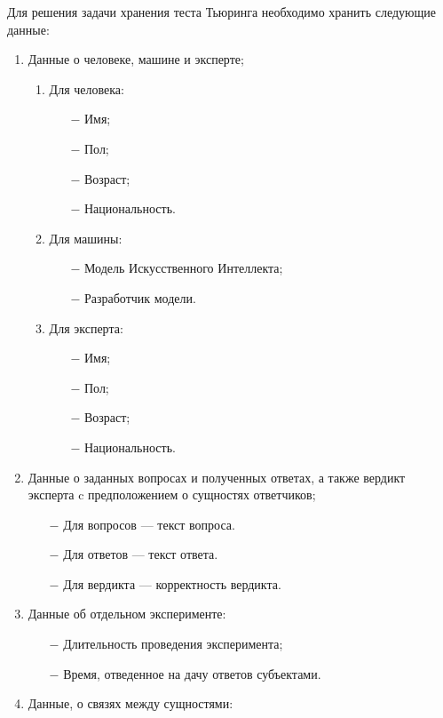 Для решения задачи хранения теста Тьюринга необходимо хранить следующие данные:
\begin{enumerate}
  \item Данные о человеке, машине и эксперте;
  \begin{enumerate}
    \item Для человека:
      \begin{itemize}
        \item[$-$] Имя;
        \item[$-$] Пол;
        \item[$-$] Возраст;
        \item[$-$] Национальность.
      \end{itemize}
    \item Для машины:
      \begin{itemize}
        \item[$-$] Модель Искусственного Интеллекта;
        \item[$-$] Разработчик модели.
      \end{itemize}
    \item Для эксперта:
      \begin{itemize}
        \item[$-$] Имя;
        \item[$-$] Пол;
        \item[$-$] Возраст;
        \item[$-$] Национальность.
      \end{itemize}
  \end{enumerate}
  \item Данные о заданных вопросах и полученных ответах, а также вердикт эксперта c предположением о сущностях ответчиков;
    \begin{itemize}
      \item[$-$] Для вопросов --- текст вопроса.
      \item[$-$] Для ответов --- текст ответа.
      \item[$-$] Для вердикта --- корректность вердикта.
    \end{itemize}
  \item Данные об отдельном эксперименте:
    \begin{itemize}
      \item[$-$] Длительность проведения эксперимента;
      \item[$-$] Время, отведенное на дачу ответов субъектами.
    \end{itemize}
  \item Данные, о связях между сущностями:

\end{enumerate}
